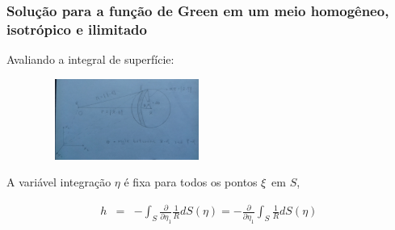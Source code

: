 \documentclass[xcolor=table]{beamer}
\newcommand{\xivec}{\boldmath \xi}
\begin{document}
\begin{frame}
\frametitle{\textbf{Solu\c{c}\~ao para a fun\c{c}\~ao de Green em um meio homog\^eneo, isotr\'opico e ilimitado}}

\begin{flushleft}
     \textcolor{red!60!black}{Avaliando a integral de superf\'icie:}
\end{flushleft}

  \begin{figure}[h!]   
    \includegraphics[width=218px, height=100px]{Figura/Fig11.jpg}       
  \end{figure}
\begin{flushleft}
 A vari\'avel integra\c{c}\~ao $\eta$ \'e fixa para todos os pontos $\xivec$ em $S$, 
\end{flushleft}
\begin{eqnarray}
  \label{ten1}
   h &=& - \int_{S}\frac{\partial }{\partial \eta_{1}} \frac{1}{R} dS(\eta)  = - \frac{\partial }{\partial \eta_{1}}\int_{S} \frac{1}{R} dS(\eta) \, 
\end{eqnarray}

\end{frame}%
\end{document}
